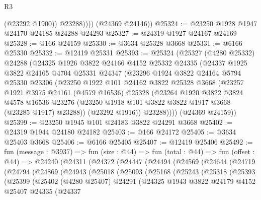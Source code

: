 \begin{lexlean}{R3}
\begin{coremodule}
                (@23292 @1900))
              @23288))))
      (@24369 @24146))
@25324 := @23250 @1928 @1947 @24170 @24185 @24288 @24293
@25327 := @24319 @1927 @24167 @24169
@25328 := @166 @24159
@25330 := @3634 @25328 @3668
@25331 := @6166 @25330
@25332 := @12419 @25331
@25393 := @25324
    (@25327
      (@4280 @25332)
      @24288
      (@24325
        @1926
        @3822
        @24166
        @4152
        @25332
        @24335
        (@24337
          @1925
          @3822
          @24165
          @4704
          @25331
          @24347
          (@23296
            @1924
            @3822
            @24164
            @5794
            @25330
            @23306
            (@23250
              @1922
              @101
              @24162
              @3822
              @25328
              @3668
              (@23257
                @1921
                @3975
                @24161
                (@4579 @16536)
                @25328
                (@23264
                  @1920
                  @3822
                  @3824
                  @4578
                  @16536
                  @23276
                  (@23250 @1918 @101 @3822 @3822 @1917 @3668 (@23285 @1917) @23288))
                (@23292 @1916))
              @23288))))
      (@24369 @24159))
@25399 := @23250 @1945 @101 @24183 @3822 @24291 @3668
@25402 := @24319 @1944 @24180 @24182
@25403 := @166 @24172
@25405 := @3634 @25403 @3668
@25406 := @6166 @25405
@25407 := @12419 @25406
@25492 := fun (message : @3937) =>
  fun (size : @44) =>
  fun (total : @44) =>
  fun (offset : @44) =>
  @24240
    (@24311
      (@24372
        (@24447
          (@24494
            (@24569
              (@24644
                (@24719
                  (@24794
                    (@24869
                      (@24943
                        (@25018
                          (@25093
                            (@25168
                              (@25243
                                (@25318
                                  (@25393
                                    (@25399
                                      (@25402
                                        (@4280 @25407)
                                        @24291
                                        (@24325
                                          @1943
                                          @3822
                                          @24179
                                          @4152
                                          @25407
                                          @24335
                                          (@24337

\end{coremodule}
\end{lexlean}
